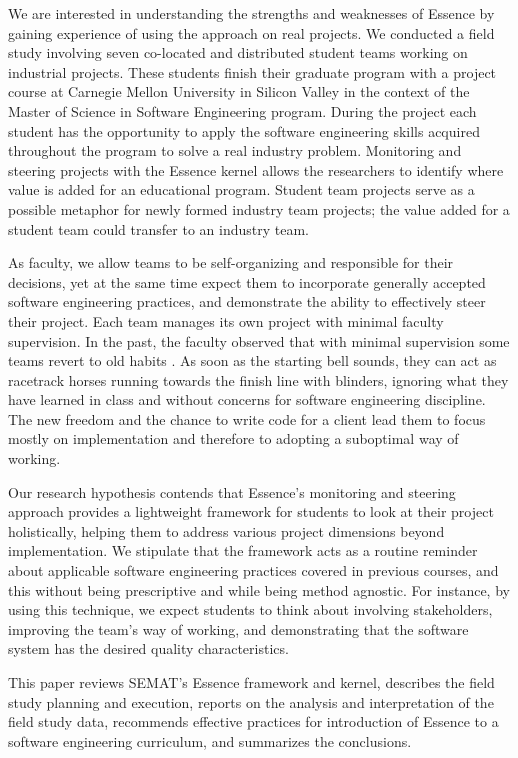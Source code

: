 We are interested in understanding the strengths and weaknesses of Essence by gaining experience of using the approach on real projects. We conducted a field study involving seven co-located and distributed student teams working on industrial projects. These students finish their graduate program with a project course at Carnegie Mellon University in Silicon Valley in the context of the Master of Science in Software Engineering program. During the project each student has the opportunity to apply the software engineering skills acquired throughout the program to solve a real industry problem. Monitoring and steering projects with the Essence kernel allows the researchers to identify where value is added for an educational program. Student team projects serve as a possible metaphor for newly formed industry team projects; the value added for a student team could transfer to an industry team.

As faculty, we allow teams to be self-organizing and responsible for their decisions, yet at the same time expect them to incorporate generally accepted software engineering practices, and demonstrate the ability to effectively steer their project. Each team manages its own project with minimal faculty supervision. In the past, the faculty observed that with minimal supervision some teams revert to old habits \cite{BareissTransferable}. As soon as the starting bell sounds, they can act as racetrack horses running towards the finish line with blinders, ignoring what they have learned in class and without concerns for software engineering discipline. The new freedom and the chance to write code for a client lead them to focus mostly on implementation and therefore to adopting a suboptimal way of working.

Our research hypothesis contends that Essence's monitoring and steering approach provides a lightweight framework for students to look at their project holistically, helping them to address various project dimensions beyond implementation. We stipulate that the framework acts as a routine reminder about applicable software engineering practices covered in previous courses, and this without being prescriptive and while being method agnostic. For instance, by using this technique, we expect students to think about involving stakeholders, improving the team's way of working, and demonstrating that the software system has the desired quality characteristics.

This paper reviews SEMAT's Essence framework and kernel, describes the field study planning and execution, reports on the analysis and interpretation of the field study data, recommends effective practices for introduction of Essence to a software engineering curriculum, and summarizes the conclusions.

